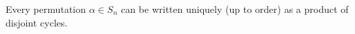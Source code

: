 Every permutation $\alpha \in S_n$ can be written uniquely (up to order) as a product of disjoint cycles.

